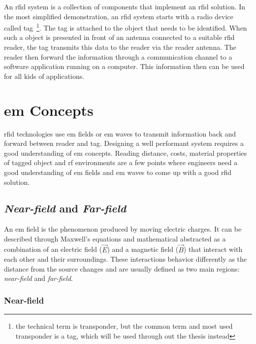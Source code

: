 An \ac{rfid} system is a collection of components that implement an \ac{rfid} solution. In the most simplified demonstration, an \ac{rfid} system starts with a radio device called tag~\footnote{the technical term is transponder, but the common term and most used transponder is a tag, which will be used through out the thesis instead}. The tag is attached to the object that needs to be identified. When such a object is presented in front of an antenna connected to a suitable \ac{rfid} reader, the tag transmits this data to the reader via the reader antenna. The reader then forward the information through a communication channel to a software application running on a computer. This information then can be used for all kids of applications.

\section{\acl{em} Concepts}


\ac{rfid} technologies use \ac{em} fields or \ac{em} waves to transmit information back and forward between reader and tag.
Designing a well performant system requires a good understanding of \ac{em} concepts.
Reading distance, costs, material properties of tagged object and \ac{rf} environments are a few points where engineers need a good understanding of \ac{em} fields and \ac{em} waves to come up with a good \ac{rfid} solution.

\subsection{\emph{Near-field} and \emph{Far-field}}

An \ac{em} field is the phenomenon produced by moving electric charges. It can be described through Maxwell's equations and mathematical abstracted as a combination of an electric field ($\vec{E}$) and a magnetic field ($\vec{B}$) that interact with each other and their surroundings.
These interactions behavior differently as the distance from the source changes and are usually defined as two main regions: \emph{near-field} and \emph{far-field}.

\subsubsection{Near-field}

